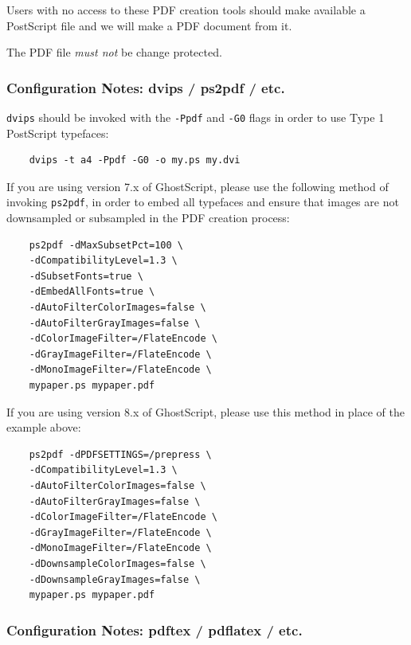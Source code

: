 \documentclass{egpubl}
\begin{document}
	Users with no access to these PDF creation tools should make available a
	PostScript file and we will make a PDF document from it.
	
	
	The PDF file \emph{must not} be change protected.
	
	\subsubsection*{Configuration Notes: dvips / ps2pdf / etc.}
	
	\noindent
	\texttt{dvips} should be invoked with the \texttt{-Ppdf} and \texttt{-G0}
	flags in order to use Type 1 PostScript typefaces:
	
	\begin{verbatim}
	dvips -t a4 -Ppdf -G0 -o my.ps my.dvi
	\end{verbatim}
	
	
	\noindent
	If you are using version 7.x of GhostScript, please use the following method of invoking \texttt{ps2pdf}, in
	order to embed all typefaces and ensure that images are not downsampled or subsampled in the PDF
	creation process:
	
	\begin{verbatim}
	ps2pdf -dMaxSubsetPct=100 \
	-dCompatibilityLevel=1.3 \
	-dSubsetFonts=true \
	-dEmbedAllFonts=true \
	-dAutoFilterColorImages=false \
	-dAutoFilterGrayImages=false \
	-dColorImageFilter=/FlateEncode \
	-dGrayImageFilter=/FlateEncode \
	-dMonoImageFilter=/FlateEncode \
	mypaper.ps mypaper.pdf
	\end{verbatim}
	
	
	If you are using version 8.x of GhostScript, please use this method in place of the example above:
	\begin{verbatim}
	ps2pdf -dPDFSETTINGS=/prepress \
	-dCompatibilityLevel=1.3 \
	-dAutoFilterColorImages=false \
	-dAutoFilterGrayImages=false \
	-dColorImageFilter=/FlateEncode \
	-dGrayImageFilter=/FlateEncode \
	-dMonoImageFilter=/FlateEncode \
	-dDownsampleColorImages=false \
	-dDownsampleGrayImages=false \
	mypaper.ps mypaper.pdf
	\end{verbatim}
	
	\subsubsection*{Configuration Notes: pdftex / pdflatex / etc.}
	
\end{document}

